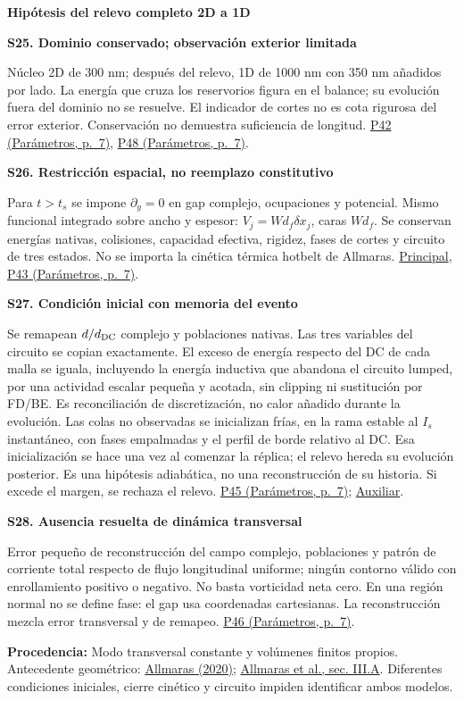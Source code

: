 \documentclass[11pt,a4paper]{article}
\newcommand{\origin}[1]{\par{\footnotesize\raggedright\color{ink}\textbf{Procedencia:} #1\par}}
\newcommand{\pref}[2]{\href{Parametros.pdf\#nameddest=#1}{#1 (Parámetros, p.~#2)}}
\newcommand{\assumption}[2]{\par\vspace{6pt}\hypertarget{#1}{\textbf{\color{ink}#1. #2}}\par}
\newcommand{\smallnote}[1]{{\small #1\par}}
\begin{document}
\clearpage
\hypertarget{dimensional-1d}{}\hypertarget{hybrid-1d}{}
{\LARGE\bfseries\color{ink}Hipótesis del relevo completo 2D a 1D}\par
\assumption{S25}{Dominio conservado; observación exterior limitada}
\smallnote{Núcleo 2D de 300 nm; después del relevo, 1D de 1000 nm con 350 nm añadidos por lado.
La energía que cruza los reservorios figura en el balance; su evolución
fuera del dominio no se resuelve. El indicador de cortes no es cota rigurosa
del error exterior. Conservación no demuestra suficiencia de longitud.
\pref{P42}{7}, \pref{P48}{7}.}
\assumption{S26}{Restricción espacial, no reemplazo constitutivo}
\smallnote{Para \(t>t_s\) se impone \(\partial_y=0\) en gap complejo,
ocupaciones y potencial. Mismo funcional integrado sobre ancho y espesor:
\(V_j=Wd_f\delta x_j\), caras \(Wd_f\). Se conservan energías nativas,
colisiones, capacidad efectiva, rigidez, fases de cortes y circuito de tres
estados. No se importa la cinética térmica hotbelt de Allmaras.
\href{Principal.pdf\#nameddest=dimensional-1d}{Principal}, \pref{P43}{7}.}
\assumption{S27}{Condición inicial con memoria del evento}
\smallnote{Se remapean \(d/d_{\rm DC}\) complejo y poblaciones nativas.
Las tres variables del circuito se copian exactamente. El exceso de energía respecto del DC de cada
malla se iguala, incluyendo la energía inductiva que abandona el circuito lumped, por una actividad escalar pequeña y acotada, sin clipping
ni sustitución por FD/BE. Es reconciliación de discretización, no calor añadido
durante la evolución. Las colas no observadas se inicializan frías, en la rama estable al \(I_s\) instantáneo, con fases empalmadas y el perfil de borde relativo al DC. Esa inicialización se hace una vez al comenzar la réplica; el relevo hereda su evolución posterior. Es una hipótesis adiabática, no una reconstrucción de su historia. Si excede el margen, se rechaza el relevo.
\pref{P45}{7}; \href{Auxiliar.pdf\#nameddest=dimensional-1d}{Auxiliar}.}
\assumption{S28}{Ausencia resuelta de dinámica transversal}
\smallnote{Error pequeño de reconstrucción del campo complejo, poblaciones y patrón de corriente total respecto de flujo longitudinal uniforme;
ningún contorno válido con enrollamiento positivo o negativo.
No basta vorticidad neta cero. En una región normal no se define fase:
el gap usa coordenadas cartesianas. La reconstrucción mezcla error transversal
y de remapeo. \pref{P46}{7}.}
\origin{Modo transversal constante y volúmenes finitos propios.
Antecedente geométrico:
\href{https://thesis.caltech.edu/13748/}{Allmaras (2020)};
\href{https://arxiv.org/pdf/1805.00130}{Allmaras et al., sec. III.A}.
Diferentes condiciones iniciales, cierre cinético y circuito impiden
identificar ambos modelos.}
\end{document}
